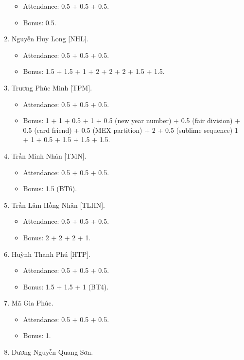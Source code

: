 \documentclass{article}
\begin{document}
\begin{enumerate}
\begin{itemize}
        \item Attendance: 0.5 + 0.5 + 0.5.
        \item Bonus: 0.5.
    \end{itemize}
    \item {\sc Nguyễn Huy Long [NHL].}
    \begin{itemize}
        \item Attendance: 0.5 + 0.5 + 0.5.
        \item Bonus: 1.5 + 1.5 + 1 + 2 + 2 + 2 + 1.5 + 1.5.
    \end{itemize}
    \item {\sc Trương Phúc Minh [TPM].}
    \begin{itemize}
        \item Attendance: 0.5 + 0.5 + 0.5.
        \item Bonus: 1 + 1 + 0.5 + 1 + 0.5 (new year number) + 0.5 (fair division) + 0.5 (card friend) + 0.5 (MEX partition) + 2 + 0.5 (sublime sequence) 1 + 1 + 0.5 + 1.5 + 1.5 + 1.5.
    \end{itemize}
    \item {\sc Trần Minh Nhân [TMN].}
    \begin{itemize}
        \item Attendance: 0.5 + 0.5 + 0.5.
        \item Bonus: 1.5 (BT6).
    \end{itemize}
    \item {\sc Trần Lâm Hồng Nhân [TLHN].}
    \begin{itemize}
        \item Attendance: 0.5 + 0.5 + 0.5.
        \item Bonus: 2 + 2 + 2 + 1.
    \end{itemize}
    \item {\sc Huỳnh Thanh Phú [HTP].}
    \begin{itemize}
        \item Attendance: 0.5 + 0.5 + 0.5.
        \item Bonus: 1.5 + 1.5 + 1 (BT4).
    \end{itemize}
    \item {\sc Mã Gia Phúc.}
    \begin{itemize}
        \item Attendance: 0.5 + 0.5 + 0.5.
        \item Bonus: 1.
    \end{itemize}
    \item {\sc Dương Nguyễn Quang Sơn.}
    \begin{itemize}

\end{itemize}
\end{enumerate}
\end{document}
